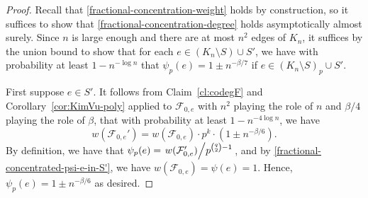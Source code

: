 \documentclass[11pt]{article}
\numberwithin{equation}{section}
\newcounter{i}
\theoremstyle{plain}
\newtheorem{claim}{Claim}[thm]
\newenvironment{proofclaim}[1][]%
{\noindent \emph{Proof.} {}{#1}{}}{\hfill
	$\Diamond$\vspace{1em}}
\theoremstyle{plain} %
\theoremstyle{definition}
\newcommand{\cF}{\mathcal{F}}
\begin{document}
\begin{proof}

Recall that \ref{fractional-concentration-weight} holds by construction, so it suffices to show that \ref{fractional-concentration-degree} holds asymptotically almost surely.    
Since $n$ is large enough and there are at most $n^2$ edges of $K_n$, it suffices by the union bound to show that for each $e\in (K_n\setminus S)\cup S'$, we have with probability at least $1-n^{-\log n}$ that $\psi_p(e) = 1\pm n^{-\beta/7}$ if $e \in (K_n\setminus S)_p \cup S'$.

First suppose $e\in S'$. 
It follows from Claim~\ref{cl:codegF} and Corollary~\ref{cor:KimVu-poly} applied to $\cF_{0,e}$ with $n^2$ playing the role of $n$ and $\beta / 4$ playing the role of $\beta$, that with probability at least $1-n^{-4\log n}$, we have
$$w(\cF_{0,e}') = w(\cF_{0,e})\cdot p^k \cdot \left(1\pm n^{-\beta/6}\right).$$ 
By definition, we have that $\psi_p(e) = \left.w(\cF'_{0,e})\middle/p^{\binom{q}{2}-1}\right.$, and 
by \eqref{fractional-concentrated-psi-e-in-S'}, we have $w(\cF_{0,e}) = \psi(e) = 1$.
Hence, $\psi_p(e) = 1\pm n^{-\beta/6}$ as desired. 


\end{proof}
\end{document}
